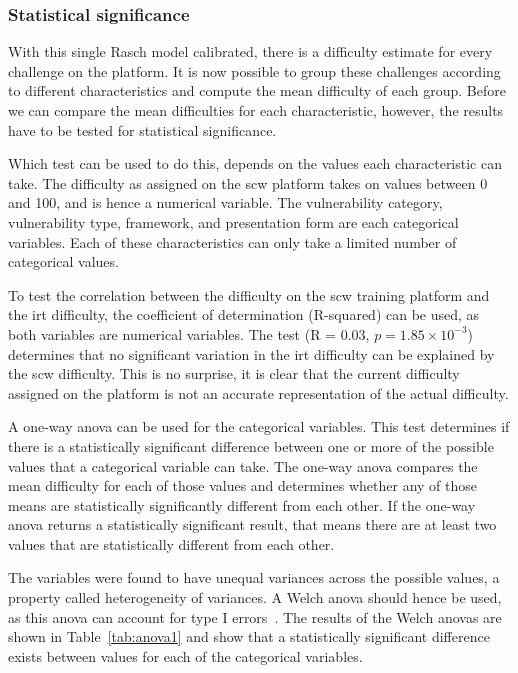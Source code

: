 \subsubsection{Statistical significance}
With this single Rasch model calibrated, there is a difficulty estimate for every challenge on the platform.
It is now possible to group these challenges according to different characteristics and compute the mean difficulty of each group.
Before we can compare the mean difficulties for each characteristic, however, the results have to be tested for statistical significance.

Which test can be used to do this, depends on the values each characteristic can take.
The difficulty as assigned on the \gls{scw} platform takes on values between 0 and 100, and is hence a numerical variable.
The vulnerability category, vulnerability type, framework, and presentation form are each categorical variables.
Each of these characteristics can only take a limited number of categorical values.

To test the correlation between the difficulty on the \gls{scw} training platform and the \gls{irt} difficulty, the coefficient of determination (R-squared) can be used, as both variables are numerical variables.
The test (R = 0.03, $p = 1.85 \times 10^{-3}$) determines that no significant variation in the \gls{irt} difficulty can be explained by the \gls{scw} difficulty.
This is no surprise, it is clear that the current difficulty assigned on the platform is not an accurate representation of the actual difficulty.

A one-way \gls{anova} can be used for the categorical variables.
This test determines if there is a statistically significant difference between one or more of the possible values that a categorical variable can take.
The one-way \gls{anova} compares the mean difficulty for each of those values and determines whether any of those means are statistically significantly different from each other.
If the one-way \gls{anova} returns a statistically significant result, that means there are at least two values that are statistically different from each other.

The variables were found to have unequal variances across the possible values, a property called heterogeneity of variances.
A Welch \gls{anova} should hence be used, as this \gls{anova} can account for type I errors~\cite{liu2015comparing}.
The results of the Welch \glspl{anova} are shown in Table~\ref{tab:anova1} and show that a statistically significant difference exists between values for each of the categorical variables.

